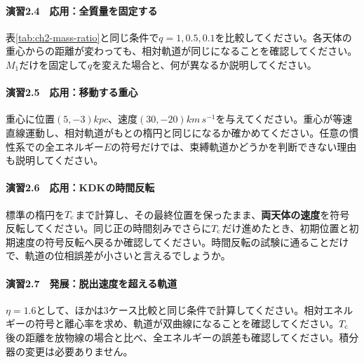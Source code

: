\paragraph{演習2.4　応用：全質量を固定する}
表\ref{tab:ch2-mass-ratio}と同じ条件で$q=1,0.5,0.1$を比較してください。各天体の重心からの距離が変わっても、相対軌道が同じになることを確認してください。$M_1$だけを固定して$q$を変えた場合と、何が異なるか説明してください。

\paragraph{演習2.5　応用：移動する重心}
重心に位置$(5,-3)\unit{kpc}$、速度$(30,-20)\unit{km\,s^{-1}}$を与えてください。重心が等速直線運動し、相対軌道がもとの楕円と同じになるか確かめてください。任意の慣性系での全エネルギー$E$の符号だけでは、束縛軌道かどうかを判断できない理由も説明してください。

\paragraph{演習2.6　応用：KDKの時間反転}
標準の楕円を$T_{\rm c}$まで計算し、その最終位置を保ったまま、\textbf{両天体の速度}を符号反転してください。同じ正の時間刻みでさらに$T_{\rm c}$だけ進めたとき、初期位置と初期速度の符号反転へ戻るか確認してください。時間反転の試験に通ることだけで、軌道の位相誤差が小さいと言えるでしょうか。

\paragraph{演習2.7　発展：脱出速度を超える軌道}
$\eta=1.6$として、ほかは3ケース比較と同じ条件で計算してください。相対エネルギーの符号と離心率を求め、軌道が双曲線になることを確認してください。$T_{\rm c}$後の距離を放物線の場合と比べ、全エネルギーの誤差も確認してください。積分器の変更は必要ありません。
